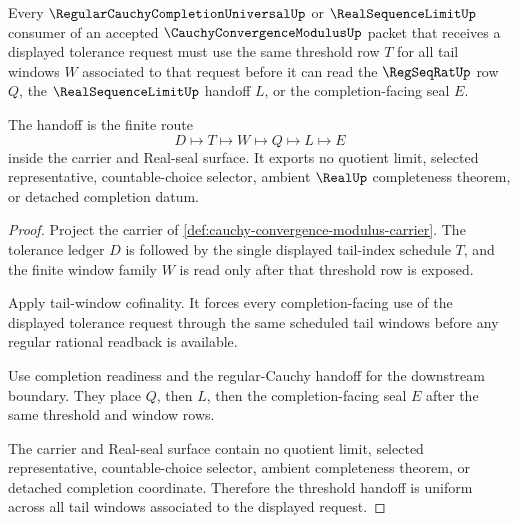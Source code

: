\begin{theorem}
\label{thm:cauchy-convergence-modulus-uniform-threshold-handoff}
Every $\RegularCauchyCompletionUniversalUp$ or $\RealSequenceLimitUp$ consumer of an accepted $\CauchyConvergenceModulusUp$ packet that receives a displayed tolerance request must use the same threshold row $T$ for all tail windows $W$ associated to that request before it can read the $\RegSeqRatUp$ row $Q$, the $\RealSequenceLimitUp$ handoff $L$, or the completion-facing seal $E$.

The handoff is the finite route
$$
D\longmapsto T\longmapsto W\longmapsto Q\longmapsto L\longmapsto E
$$
inside the carrier and Real-seal surface. It exports no quotient limit, selected representative, countable-choice selector, ambient $\RealUp$ completeness theorem, or detached completion datum.
\end{theorem}
\begin{proof}
Project the carrier of \autoref{def:cauchy-convergence-modulus-carrier}. The tolerance ledger $D$ is followed by the single displayed tail-index schedule $T$, and the finite window family $W$ is read only after that threshold row is exposed.

Apply tail-window cofinality. It forces every completion-facing use of the displayed tolerance request through the same scheduled tail windows before any regular rational readback is available.

Use completion readiness and the regular-Cauchy handoff for the downstream boundary. They place $Q$, then $L$, then the completion-facing seal $E$ after the same threshold and window rows.

The carrier and Real-seal surface contain no quotient limit, selected representative, countable-choice selector, ambient completeness theorem, or detached completion coordinate. Therefore the threshold handoff is uniform across all tail windows associated to the displayed request.
\end{proof}

